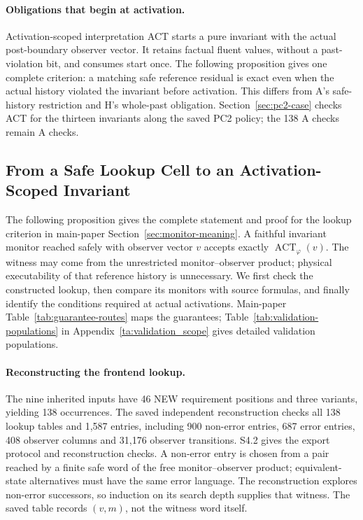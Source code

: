 \paragraph{Obligations that begin at activation.}
\label{sec:activation-scoped}
Activation-scoped interpretation ACT starts a pure invariant with the actual post-boundary observer vector. It retains factual fluent values, without a past-violation bit, and consumes start once. The following proposition gives one complete criterion: a matching safe reference residual is exact even when the actual history violated the invariant before activation. This differs from A's safe-history restriction and H's whole-past obligation. Section~\ref{sec:pc2-case} checks ACT for the thirteen invariants along the saved PC2 policy; the 138 A checks remain A checks.

\subsection{From a Safe Lookup Cell to an Activation-Scoped Invariant}
\label{ta:lookup-act}
The following proposition gives the complete statement and proof for the lookup criterion in main-paper Section~\ref{sec:monitor-meaning}. A faithful invariant monitor reached safely with observer vector $v$ accepts exactly $\operatorname{ACT}_\varphi(v)$. The witness may come from the unrestricted monitor--observer product; physical executability of that reference history is unnecessary. We first check the constructed lookup, then compare its monitors with source formulas, and finally identify the conditions required at actual activations. Main-paper Table~\ref{tab:guarantee-routes} maps the guarantees; Table~\ref{tab:validation-populations} in Appendix~\ref{ta:validation_scope} gives detailed validation populations.



\paragraph{Reconstructing the frontend lookup.}
The nine inherited inputs have 46 NEW requirement positions and three variants, yielding 138 occurrences. The saved independent reconstruction checks all 138 lookup tables and 1,587 entries, including 900 non-error entries, 687 error entries, 408 observer columns and 31,176 observer transitions. S4.2 gives the export protocol and reconstruction checks. A non-error entry is chosen from a pair reached by a finite safe word of the free monitor--observer product; equivalent-state alternatives must have the same error language. The reconstruction explores non-error successors, so induction on its search depth supplies that witness. The saved table records $(v,m)$, not the witness word itself.

